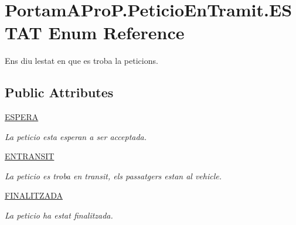 \hypertarget{enum_portam_a_pro_p_1_1_peticio_en_tramit_1_1_e_s_t_a_t}{}\section{Portam\+A\+Pro\+P.\+Peticio\+En\+Tramit.\+E\+S\+T\+AT Enum Reference}
\label{enum_portam_a_pro_p_1_1_peticio_en_tramit_1_1_e_s_t_a_t}


Ens diu l\textquotesingle{}estat en que es troba la peticions.  


\subsection*{Public Attributes}
\begin{DoxyCompactItemize}
\item 
\mbox{\label{enum_portam_a_pro_p_1_1_peticio_en_tramit_1_1_e_s_t_a_t_aa0c691ba4d59b7b19ffa2b69ff2a53d8}} 
\hyperlink{enum_portam_a_pro_p_1_1_peticio_en_tramit_1_1_e_s_t_a_t_aa0c691ba4d59b7b19ffa2b69ff2a53d8}{E\+S\+P\+E\+RA}
\begin{DoxyCompactList}\small\item\em La peticio esta esperan a ser acceptada. \end{DoxyCompactList}\item 
\mbox{\label{enum_portam_a_pro_p_1_1_peticio_en_tramit_1_1_e_s_t_a_t_a5e3ea99d298eeac2446a60da41e059fd}} 
\hyperlink{enum_portam_a_pro_p_1_1_peticio_en_tramit_1_1_e_s_t_a_t_a5e3ea99d298eeac2446a60da41e059fd}{E\+N\+T\+R\+A\+N\+S\+IT}
\begin{DoxyCompactList}\small\item\em La peticio es troba en transit, els passatgers estan al vehicle. \end{DoxyCompactList}\item 
\mbox{\label{enum_portam_a_pro_p_1_1_peticio_en_tramit_1_1_e_s_t_a_t_abf0a40f8890af1f58af3b04ee7247562}} 
\hyperlink{enum_portam_a_pro_p_1_1_peticio_en_tramit_1_1_e_s_t_a_t_abf0a40f8890af1f58af3b04ee7247562}{F\+I\+N\+A\+L\+I\+T\+Z\+A\+DA}
\begin{DoxyCompactList}\small\item\em La peticio ha estat finalitzada. \end{DoxyCompactList}\end{DoxyCompactItemize}


